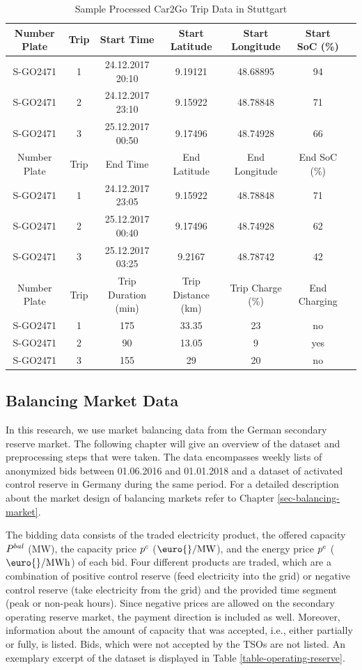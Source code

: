 \documentclass[a4paper, 12pt]{article}
\begin{document}
\begin{table}
    \caption{Sample Processed Car2Go Trip Data in Stuttgart \label{table-car2go-processed}}
    \centering
    \begin{tabular}{cc|ccccc}
      \hline
      \hline
      Number Plate & Trip & Start Time & Start Latitude & Start Longitude & Start SoC (\%)\\
      \hline
      S-GO2471 & 1 & 24.12.2017 20:10 & 9.19121 & 48.68895 & 94\\
      S-GO2471 & 2 & 24.12.2017 23:10 & 9.15922 & 48.78848 & 71\\
      S-GO2471 & 3 & 25.12.2017 00:50 & 9.17496 & 48.74928 & 66\\
      \hline
      Number Plate & Trip & End Time & End Latitude & End Longitude & End SoC (\%)\\
      \hline
      S-GO2471 & 1 & 24.12.2017 23:05 & 9.15922 & 48.78848 & 71\\
      S-GO2471 & 2 & 25.12.2017 00:40 & 9.17496 & 48.74928 & 62\\
      S-GO2471 & 3 & 25.12.2017 03:25 & 9.2167 & 48.78742 & 42\\
      \hline
      Number Plate & Trip & Trip Duration (min) & Trip Distance (km) & Trip Charge (\%) & End Charging\\
      \hline
      S-GO2471 & 1 & 175 & 33.35 & 23 & no\\
      S-GO2471 & 2 & 90 & 13.05 & 9 & yes\\
      S-GO2471 & 3 & 155 & 29 & 20 & no\\
      \hline
      \hline
    \end{tabular}
\end{table}

\subsection{Balancing Market Data}
\label{sec:org58e1ed6}
In this research, we use market balancing data from the German secondary reserve
market. The following chapter will give an overview of the dataset and
preprocessing steps that were taken. The data encompasses weekly lists of
anonymized bids between 01.06.2016 and 01.01.2018 and a dataset of activated
control reserve in Germany during the same period. For a detailed description
about the market design of balancing markets refer to Chapter
\ref{sec-balancing-market}.

The bidding data consists of the traded electricity product, the offered
capacity \(P^{bal}_{}\) (MW), the capacity price \(p^c_{}\) (\(\text{\euro{}/MW}\)), and the
energy price \(p^e_{}\) (\(\text{\euro{}/MWh}\)) of each bid. Four different products
are traded, which are a combination of positive control reserve (feed
electricity into the grid) or negative control reserve (take electricity from
the grid) and the provided time segment (peak or non-peak hours). Since negative
prices are allowed on the secondary operating reserve market, the payment
direction is included as well. Moreover, information about the amount of
capacity that was accepted, i.e., either partially or fully, is listed. Bids,
which were not accepted by the TSOs are not listed. An exemplary excerpt of the
dataset is displayed in Table \ref{table-operating-reserve}.
\end{document}
